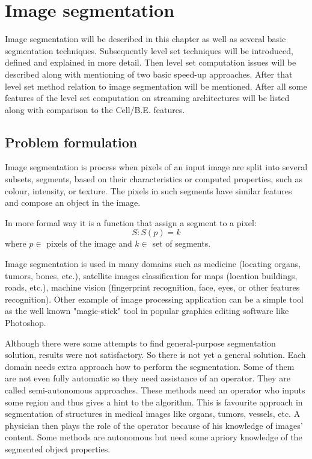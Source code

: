 \chapter{Image segmentation}

Image segmentation will be described in this chapter as well as several basic segmentation techniques.
Subsequently level set techniques will be introduced, defined and explained in more detail.
Then level set computation issues will be described along with mentioning of two basic speed-up approaches.
After that level set method relation to image segmentation will be mentioned.
After all some features of the level set computation on streaming architectures will be listed along with comparison to the \mbox{Cell/B.E.} features.

\section{Problem formulation}
Image segmentation is process when pixels of an input image are split into several subsets, segments, based on their characteristics or computed properties, such as colour, intensity, or texture.
The pixels in such segments have similar features and compose an object in the image.

In more formal way it is a function that assign a segment to a pixel:
\begin{equation}
S: S(p) = k
\end{equation}
where $p \in$ pixels of the image and $k \in$ set of segments.

Image segmentation is used in many domains such as medicine (locating organs, tumors, bones, etc.), satellite images classification for maps (location buildings, roads, etc.), machine vision (fingerprint recognition, face, eyes, or other features recognition).
Other example of image processing application can be a simple tool as the well known "magic-stick" tool in popular graphics editing software like Photoshop.

\par
Although there were some attempts to find general-purpose segmentation solution, results were not satisfactory.
So there is not yet a general solution.
Each domain needs extra approach how to perform the segmentation.
Some of them are not even fully automatic so they need assistance of an operator.
They are called semi-autonomous approaches.
These methods need an operator who inputs some region and thus gives a hint to the algorithm.
This is favourite approach in segmentation of structures in medical images like organs, tumors, vessels, etc.
A physician then plays the role of the operator because of his knowledge of images' content.
Some methods are autonomous but need some apriory knowledge of the segmented object properties.

